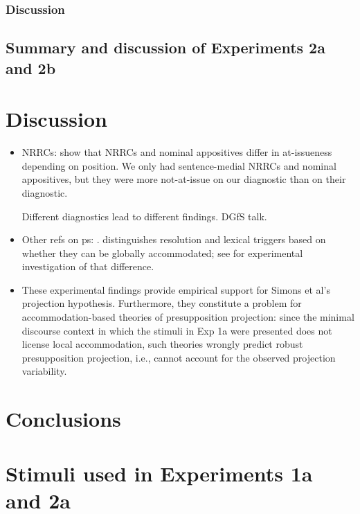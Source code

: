 \documentclass[11pt,fleqn]{article}
\newcommand{\6}{\mbox{$[\hspace*{-.6mm}[$}}
\newcommand{\9}{\mbox{$]\hspace*{-.6mm}]$}}
\begin{document}
\subsubsection{Discussion}

\subsection{Summary and discussion of Experiments 2a and 2b}

\section{Discussion}\label{s5}

\begin{itemize}

\item NRRCs: \citealt{syrett-koev2015} show that NRRCs and nominal appositives differ in at-issueness depending on position. We only had sentence-medial NRRCs and nominal appositives, but they were more not-at-issue on our diagnostic than on their diagnostic.

Different diagnostics lead to different findings. DGfS talk.

\item Other refs on ps: \citealt{schwarz07,chemla09,tiemann-etal11}. \citealt{zeevat92} distinguishes resolution and lexical triggers based on whether they can be globally accommodated; see \citealt{amaral-cummins2015} for experimental investigation of that difference.

\item These experimental findings provide empirical support for Simons et al's projection hypothesis. Furthermore, they constitute a problem for accommodation-based theories of presupposition projection: since the minimal discourse context in which the stimuli in Exp 1a were presented does not license local accommodation, such theories wrongly predict robust presupposition projection, i.e., cannot account for the observed projection variability.

\end{itemize}

\section{Conclusions}\label{s6}

\appendix

\section{Stimuli used in Experiments 1a and 2a}\label{a-exp1a-2a-stimuli}
\end{document}
